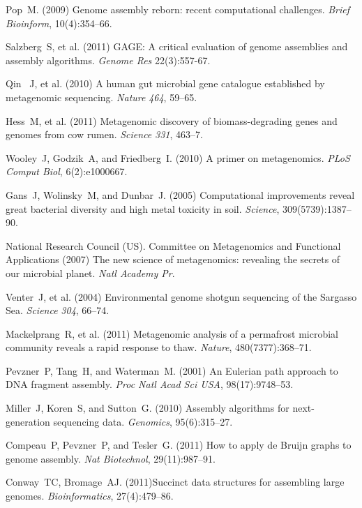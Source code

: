 \documentclass{pnastwo}
\begin{document}
\begin{article}
\begin{thebibliography}{10}
 Pop~M. (2009) Genome assembly reborn: recent 
computational challenges. {\it Brief Bioinform}, 10(4):354--66.

 Salzberg~S, et al. (2011) GAGE: A critical 
evaluation of genome assemblies and assembly algorithms. {\it Genome Res} 
22(3):557-67.

 Qin ~J, et al. (2010) A human gut microbial gene catalogue 
established by metagenomic sequencing. {\it Nature} \emph{464}, 59--65.

 Hess~M, et al. (2011) Metagenomic discovery of 
biomass-degrading genes and genomes from cow rumen. {\it Science} 
\emph{331}, 463--7.

 Wooley~J, Godzik~A, and Friedberg~I. (2010) A primer 
on metagenomics. {\it PLoS Comput Biol}, 6(2):e1000667.

 Gans~J, Wolinsky~M, and Dunbar~J. (2005) 
Computational improvements reveal great bacterial diversity and high metal 
toxicity in soil. {\it Science}, 309(5739):1387--90.

 National Research Council (US). Committee on Metagenomics 
and Functional Applications (2007) The new science of metagenomics: revealing 
the secrets of our microbial planet. {\it Natl Academy Pr}.

 Venter~J, et al. (2004) Environmental genome shotgun 
sequencing of the Sargasso Sea. {\it Science} \emph{304}, 66--74.

 Mackelprang~R, et al. (2011) Metagenomic analysis of a 
permafrost microbial community reveals a rapid response to thaw. {\it Nature}, 
480(7377):368--71.

 Pevzner~P, Tang~H, and Waterman~M. (2001) An 
Eulerian path approach to DNA fragment assembly. {\it Proc Natl Acad Sci USA},
 98(17):9748--53.

 Miller~J, Koren~S, and Sutton~G. (2010) Assembly 
algorithms for next-generation sequencing data. {\it Genomics}, 95(6):315--27.

 Compeau~P, Pevzner~P, and Tesler~G. (2011) How to 
apply de {B}ruijn graphs to genome assembly. {\it Nat Biotechnol}, 
29(11):987--91.

 Conway~TC, Bromage~AJ.  (2011)Succinct data structures for
assembling large genomes.  {\it Bioinformatics}, 27(4):479--86.


\end{thebibliography}
\end{article}
\end{document}
